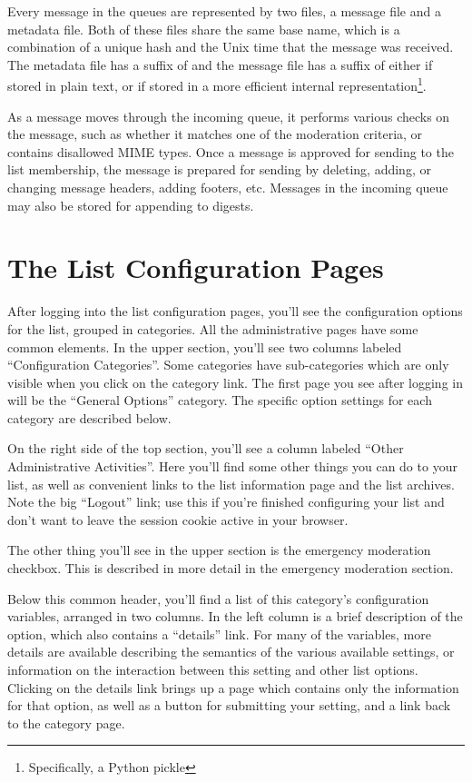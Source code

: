 \documentclass{howto}
\begin{document}
Every message in the queues are represented by two files, a message
file and a metadata file.  Both of these files share the same base
name, which is a combination of a unique hash and the Unix time that
the message was received.  The metadata file has a suffix of
 and the message file has a suffix of either  if
stored in plain text, or  if stored in a more efficient
internal representation\footnote{Specifically, a Python pickle}.

As a message moves through the incoming queue, it performs various
checks on the message, such as whether it matches one of the
moderation criteria, or contains disallowed MIME types.  Once a
message is approved for sending to the list membership, the message is
prepared for sending by deleting, adding, or changing message headers,
adding footers, etc.  Messages in the incoming queue may also be
stored for appending to digests.

\section{The List Configuration Pages}

After logging into the list configuration pages, you'll see the
configuration options for the list, grouped in categories.  All the
administrative pages have some common elements.  In the upper section,
you'll see two columns labeled ``Configuration Categories''.  Some
categories have sub-categories which are only visible when you click
on the category link.  The first page you see after logging in will be
the ``General Options'' category.  The specific option settings for
each category are described below.

On the right side of the top section, you'll see a column labeled
``Other Administrative Activities''.  Here you'll find some other
things you can do to your list, as well as convenient links to the
list information page and the list archives.  Note the big ``Logout''
link; use this if you're finished configuring your list and don't want
to leave the session cookie active in your browser.

The other thing you'll see in the upper section is the emergency
moderation checkbox.  This is described in more detail in the
emergency moderation section.

Below this common header, you'll find a list of this category's
configuration variables, arranged in two columns.  In the left column
is a brief description of the option, which also contains a
``details'' link.  For many of the variables, more details are
available describing the semantics of the various available settings,
or information on the interaction between this setting and other list
options.  Clicking on the details link brings up a page which contains
only the information for that option, as well as a button for
submitting your setting, and a link back to the category page.
\end{document}
